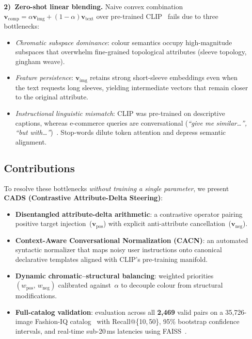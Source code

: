 \documentclass[conference]{IEEEtran}
\begin{document}
\textbf{2)~Zero-shot linear blending.}  Naive convex combination $\mathbf{v}_{\text{comp}}=\alpha\mathbf{v}_{\text{img}}+(1{-}\alpha)\mathbf{v}_{\text{text}}$ over pre-trained CLIP~\cite{chia2022fashionclip} fails due to three bottlenecks:
\begin{itemize}
    \item \textit{Chromatic subspace dominance}: colour semantics occupy high-magnitude subspaces that overwhelm fine-grained topological attributes (sleeve topology, gingham weave).
    \item \textit{Feature persistence}: $\mathbf{v}_{\text{img}}$ retains strong short-sleeve embeddings even when the text requests long sleeves, yielding intermediate vectors that remain closer to the original attribute.
    \item \textit{Instructional linguistic mismatch}: CLIP was pre-trained on descriptive captions, whereas e-commerce queries are conversational (\textit{``give me similar\ldots'', ``but with\ldots''})~\cite{tang2024circled}. Stop-words dilute token attention and depress semantic alignment.
\end{itemize}

\subsection{Contributions}
To resolve these bottlenecks \emph{without training a single parameter}, we present \textbf{CADS (Contrastive Attribute-Delta Steering)}:
\begin{itemize}
    \item \textbf{Disentangled attribute-delta arithmetic}: a contrastive operator pairing positive target injection~($\mathbf{v}_{\text{pos}}$) with explicit anti-attribute cancellation~($\mathbf{v}_{\text{neg}}$).
    \item \textbf{Context-Aware Conversational Normalization (CACN)}: an automated syntactic normalizer that maps noisy user instructions onto canonical declarative templates aligned with CLIP's pre-training manifold.
    \item \textbf{Dynamic chromatic--structural balancing}: weighted priorities $(w_{\text{pos}},\,w_{\text{neg}})$ calibrated against~$\alpha$ to decouple colour from structural modifications.
    \item \textbf{Full-catalog validation}: evaluation across all \textbf{2{,}469} valid pairs on a 35{,}726-image Fashion-IQ catalog~\cite{wu2021fashioniq} with Recall@\{10,\,50\}, 95\% bootstrap confidence intervals, and real-time sub-20\,ms latencies using FAISS~\cite{grenze2024fashioniqx, faiss2023billion}.
\end{itemize}
\end{document}
